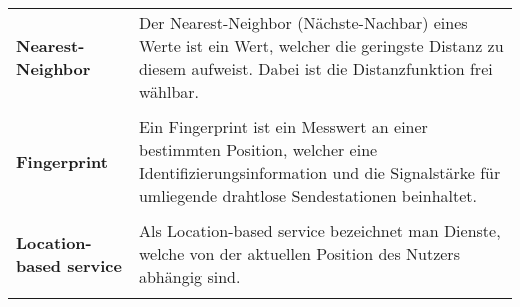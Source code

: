   \begin{tabular}[t]{lp{10cm}}
	\textbf{Nearest-Neighbor} & Der Nearest-Neighbor (Nächste-Nachbar) eines Werte ist ein Wert, welcher die geringste Distanz zu diesem aufweist. Dabei ist die Distanzfunktion frei wählbar. \\ \\
	\textbf{Fingerprint} & Ein Fingerprint ist ein Messwert an einer bestimmten Position, welcher eine Identifizierungsinformation und die Signalstärke für umliegende drahtlose Sendestationen beinhaltet.\\ \\
  	\textbf{Location-based service} & Als Location-based service bezeichnet man Dienste, welche von der aktuellen Position des Nutzers abhängig sind. \\ \\
  \end{tabular}
  
